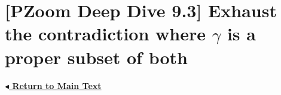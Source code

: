 \documentclass[11pt]{article}
\begin{document}
\pagestyle{empty} %

\section*{[PZoom Deep Dive 9.3] Exhaust the contradiction where $\gamma$ is a proper subset of both}

\vspace{0.8cm}
\noindent
\href{\pzbaseUrl/assets/pdfs/entry-0009/entry-0009-ordinals-part-i.pdf#body:entry-0009-3}{\textbf{\ensuremath{\blacktriangleleft} Return to Main Text}}
\end{document}
